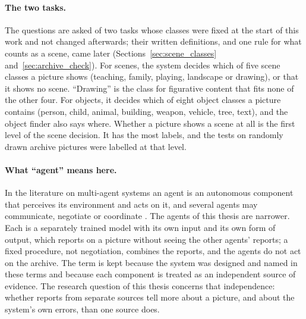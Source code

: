 \documentclass[12pt,a4paper]{report}
\begin{document}
\paragraph{The two tasks.} The questions are asked of two tasks whose classes were fixed at the start of this work and not changed afterwards; their written definitions, and one rule for what counts as a scene, came later (Sections~\ref{sec:scene_classes} and~\ref{sec:archive_check}). For scenes, the system decides which of five scene classes a picture shows (teaching, family, playing, landscape or drawing), or that it shows no scene. ``Drawing'' is the class for figurative content that fits none of the other four. For objects, it decides which of eight object classes a picture contains (person, child, animal, building, weapon, vehicle, tree, text), and the object finder also says where. Whether a picture shows a scene at all is the first level of the scene decision. It has the most labels, and the tests on randomly drawn archive pictures were labelled at that level.

\paragraph{What ``agent'' means here.} In the literature on multi-agent systems an agent is an autonomous component that perceives its environment and acts on it, and several agents may communicate, negotiate or coordinate \cite{wooldridge1995agents,wooldridge2009mas}. The agents of this thesis are narrower. Each is a separately trained model with its own input and its own form of output, which reports on a picture without seeing the other agents' reports; a fixed procedure, not negotiation, combines the reports, and the agents do not act on the archive. The term is kept because the system was designed and named in these terms and because each component is treated as an independent source of evidence. The research question of this thesis concerns that independence: whether reports from separate sources tell more about a picture, and about the system's own errors, than one source does.
\end{document}
